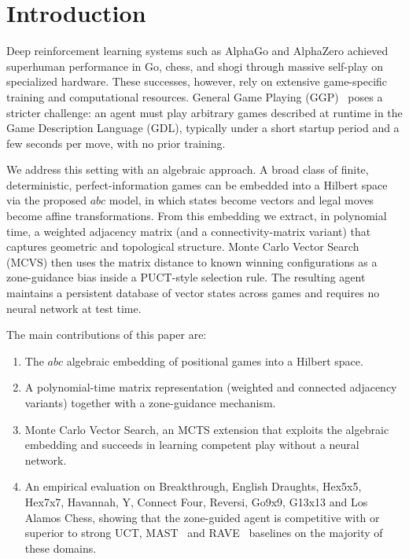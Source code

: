 \documentclass[11pt,a4paper]{article}
\theoremstyle{plain}
\theoremstyle{definition}
\begin{document}
\newpage

\tableofcontents

\newpage


\section{Introduction}
\label{sec:introduction}

Deep reinforcement learning systems such as AlphaGo and AlphaZero achieved superhuman performance in Go, chess, and shogi through massive self-play on specialized hardware. These successes, however, rely on extensive game-specific training and computational resources. General Game Playing (GGP)~\cite{genesereth2005general,love2006general} poses a stricter challenge: an agent must play arbitrary games described at runtime in the Game Description Language (GDL), typically under a short startup period and a few seconds per move, with no prior training.

\vspace{0.5em}

We address this setting with an algebraic approach. A broad class of finite, deterministic, perfect-information games can be embedded into a Hilbert space via the proposed \(abc\) model, in which states become vectors and legal moves become affine transformations. From this embedding we extract, in polynomial time, a weighted adjacency matrix (and a connectivity-matrix variant) that captures geometric and topological structure. Monte Carlo Vector Search (MCVS) then uses the matrix distance to known winning configurations as a zone-guidance bias inside a PUCT-style selection rule. The resulting agent maintains a persistent database of vector states across games and requires no neural network at test time.

\vspace{0.5em}

The main contributions of this paper are:
\begin{enumerate}
\item The \(abc\) algebraic embedding of positional games into a Hilbert space.
\item A polynomial-time matrix representation (weighted and connected adjacency variants) together with a zone-guidance mechanism.
\item Monte Carlo Vector Search, an MCTS extension that exploits the algebraic embedding and succeeds in learning competent play without a neural network.
\item An empirical evaluation on Breakthrough, English Draughts, Hex5x5, Hex7x7, Havannah, Y, Connect Four, Reversi, Go9x9, G13x13 and Los Alamos Chess, showing that the zone-guided agent is competitive with or superior to strong UCT, MAST~\cite{bjornsson2009cadiaplayer} and RAVE~\cite{gelly2007combining} baselines on the majority of these domains.
\end{enumerate}
\end{document}
